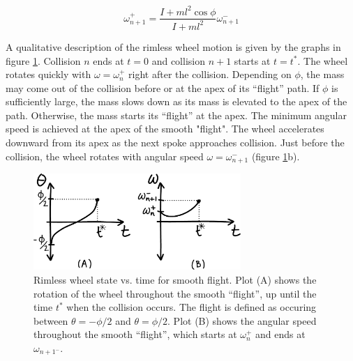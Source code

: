 \begin{equation}
\omega_{n+1}^{+} = \frac{I + ml^{2} \cos{\phi}}{I + ml^2} \omega_{n+1}^{-}
\label{eq:RimlessOmegaPlus}
\end{equation}

A qualitative description of the rimless wheel motion is given by the graphs in figure \ref{fig:RimlessPlots}. Collision $n$ ends at $t = 0$ and collision $n+1$ starts at $t = t^*$. The wheel rotates quickly with $\omega = \omega_{n}^{+}$ right after the collision. Depending on $\phi$, the mass may come out of the collision before or at the apex of its ``flight'' path. If $\phi$ is sufficiently large, the mass slows down as its mass is elevated to the apex of the path. Otherwise, the mass starts its ``flight'' at the apex. The minimum angular speed is achieved at the apex of the smooth "flight". The wheel accelerates downward from its apex as the next spoke approaches collision. Just before the collision, the wheel rotates with angular speed $\omega = \omega_{n+1}^{-}$ (figure \ref{fig:RimlessPlots}b).

\begin{figure}[h]		%
\begin{centering}
\includegraphics[width=0.7\textwidth]{Figures/RimlessPlots}\par
\end{centering}
\caption[Plot: Rimless Wheel State vs. Time for Smooth ``Flight'']{Rimless wheel state vs. time for smooth flight. Plot (A) shows the rotation of the wheel throughout the smooth ``flight'', up until the time $t^{*}$ when the collision occurs. The flight is defined as occuring between $\theta = -\phi/2$ and $\theta = \phi/2$. Plot (B) shows the angular speed throughout the smooth ``flight'', which starts at $\omega_{n}^{+}$ and ends at $\omega_{n+1^{-}}$.}
\label{fig:RimlessPlots}
\end{figure}
%

